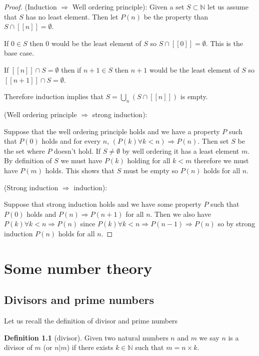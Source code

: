 \documentclass[
]{book}
\theoremstyle{definition}
\newtheorem{definition}{Definition}[chapter]
\theoremstyle{definition}
\theoremstyle{definition}
\theoremstyle{definition}
\theoremstyle{remark}
\begin{document}
\begin{proof}
(Induction \(\Rightarrow\) Well ordering principle): Given a set \(S \subset \mathbb{N}\) let us assume that \(S\) has no least element. Then let \(P(n)\) be the property than \(S \cap [[n]]= \emptyset\).

If \(0 \in S\) then \(0\) would be the least element of \(S\) so \(S \cap [[0]]= \emptyset\). This is the base case.

If \([[n]] \cap S = \emptyset\) then if \(n+1 \in S\) then \(n+1\) would be the least element of \(S\) so \([[n+1]] \cap S = \emptyset\).

Therefore induction implies that \(S = \bigcup_n (S \cap [[n]])\) is empty.

(Well ordering principle \(\Rightarrow\) strong induction):

Suppose that the well ordering principle holds and we have a property \(P\) such that \(P(0)\) holds and for every \(n\), \((P(k) \forall k<n) \Rightarrow P(n)\). Then set \(S\) be the set where \(P\) doesn't hold. If \(S \neq \emptyset\) by well ordering it has a least element \(m\). By definition of \(S\) we must have \(P(k)\) holding for all \(k<m\) therefore we must have \(P(m)\) holds. This shows that \(S\) must be empty so \(P(n)\) holds for all \(n\).

(Strong induction \(\Rightarrow\) induction):

Suppose that strong induction holds and we have some property \(P\) such that \(P(0)\) holds and \(P(n) \Rightarrow P(n+1)\) for all \(n\). Then we also have \(P(k) \forall k< n \Rightarrow P(n)\) since \(P(k) \forall k < n \Rightarrow P(n-1) \Rightarrow P(n)\) so by strong induction \(P(n)\) holds for all \(n\).
\end{proof}

\chapter{Some number theory}\label{some-number-theory}

\section{Divisors and prime numbers}\label{divisors-and-prime-numbers}

Let us recall the definition of divisor and prime numbers

\begin{definition}[divisor]
Given two natural numbers \(n\) and \(m\) we say \(n\) is a divisor of \(m\) (or \(n|m\)) if there exists \(k \in \mathbb{N}\) such that \(m=n\times k\).
\end{definition}
\end{document}
